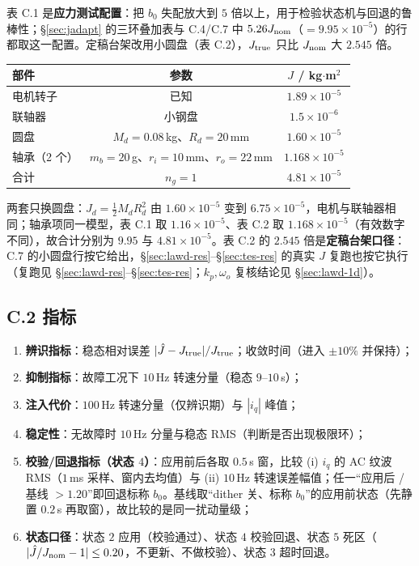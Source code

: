 \documentclass[11pt,a4paper]{article}
\theoremstyle{remark}\newtheorem{remark}{注}
\begin{document}
表 C.1 是\textbf{应力测试配置}：把 $b_0$ 失配放大到 $5$ 倍以上，用于检验状态机与回退的鲁棒性；§\ref{sec:jadapt} 的三环叠加表与 C.4/C.7 中 $5.26J_{\rm nom}$（$=9.95\times10^{-5}$）的行都取这一配置。定稿台架改用小圆盘（表 C.2），$J_{\rm true}$ 只比 $J_{\rm nom}$ 大 $2.545$ 倍。

\begin{center}\footnotesize
\begin{tabular}{@{}lcc@{}}
\toprule
部件 & 参数 & $J$ / kg$\cdot$m$^2$\\
\midrule
电机转子 & 已知 & $1.89\times10^{-5}$\\
联轴器 & 小钢盘 & $1.5\times10^{-6}$\\
圆盘 & $M_d=0.08$\,kg、$R_d=20$\,mm & $1.60\times10^{-5}$\\
轴承（2 个） & $m_b=20$\,g、$r_i=10$\,mm、$r_o=22$\,mm & $1.168\times10^{-5}$\\
\midrule
合计 & $n_g=1$ & $4.81\times10^{-5}$\\
\bottomrule
\end{tabular}
\end{center}

两套只换圆盘：$J_d=\frac12M_dR_d^2$ 由 $1.60\times10^{-5}$ 变到 $6.75\times10^{-5}$，电机与联轴器相同；轴承项同一模型，表 C.1 取 $1.16\times10^{-5}$、表 C.2 取 $1.168\times10^{-5}$（有效数字不同），故合计分别为 $9.95$ 与 $4.81\times10^{-5}$。表 C.2 的 $2.545$ 倍是\textbf{定稿台架口径}：C.7 的小圆盘行按它给出，§\ref{sec:lawd-res}--§\ref{sec:tes-res} 的真实 $J$ 复跑也按它执行（复跑见 §\ref{sec:lawd-res}--§\ref{sec:tes-res}；$k_p,\omega_o$ 复核结论见 §\ref{sec:lawd-1d}）。

\subsection*{C.2 指标}

\begin{enumerate}
  \item \textbf{辨识指标}：稳态相对误差 $|\hat J-J_{\rm true}|/J_{\rm true}$；收敛时间（进入 $\pm10\%$ 并保持）；
  \item \textbf{抑制指标}：故障工况下 $10$\,Hz 转速分量（稳态 $9$--$10$\,s）；
  \item \textbf{注入代价}：$100$\,Hz 转速分量（仅辨识期）与 $|i_q|$ 峰值；
  \item \textbf{稳定性}：无故障时 $10$\,Hz 分量与稳态 RMS（判断是否出现极限环）；
  \item \textbf{校验/回退指标（状态 $4$）}：应用前后各取 $0.5$\,s 窗，比较 (i) $i_q$ 的 AC 纹波 RMS（$1$\,ms 采样、窗内去均值）与 (ii) $10$\,Hz 转速误差幅值；任一“应用后 / 基线 $>1.20$”即回退标称 $b_0$。基线取“dither 关、标称 $b_0$”的应用前状态（先静置 $0.2$\,s 再取窗），故比较的是同一扰动量级；
  \item \textbf{状态口径}：状态 $2$ 应用（校验通过）、状态 $4$ 校验回退、状态 $5$ 死区（$|\hat J/J_{\rm nom}-1|\le0.20$，不更新、不做校验）、状态 $3$ 超时回退。
\end{enumerate}
\end{document}
